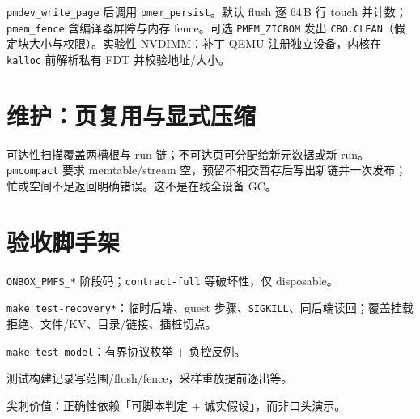 \texttt{pmdev\_write\_page} 后调用 \texttt{pmem\_persist}。默认 flush 逐 64\,B 行 touch 并计数；\texttt{pmem\_fence} 含编译器屏障与内存 fence。可选 \texttt{PMEM\_ZICBOM} 发出 \texttt{CBO.CLEAN}（假定块大小与权限）。实验性 NVDIMM：补丁 QEMU 注册独立设备，内核在 \texttt{kalloc} 前解析私有 FDT 并校验地址/大小。

\section{维护：页复用与显式压缩}

可达性扫描覆盖两槽根与 run 链；不可达页可分配给新元数据或新 run。\texttt{pmcompact} 要求 memtable/stream 空，预留不相交暂存后写出新链并一次发布；忙或空间不足返回明确错误。这不是在线全设备 GC。

\section{验收脚手架}

\begin{description}[leftmargin=1.5em,style=nextline]
  \item[旧自测] \texttt{ONBOX\_PMFS\_*} 阶段码；\texttt{contract-full} 等破坏性，仅 disposable。
  \item[重启 oracle] \texttt{make test-recovery*}：临时后端、guest 步骤、\texttt{SIGKILL}、同后端读回；覆盖挂载拒绝、文件/KV、目录/链接、插桩切点。
  \item[模型] \texttt{make test-model}：有界协议枚举 + 负控反例。
  \item[轨迹] 测试构建记录写范围/flush/fence，采样重放提前逐出等。
\end{description}

尖刺价值：正确性依赖「可脚本判定 + 诚实假设」，而非口头演示。
